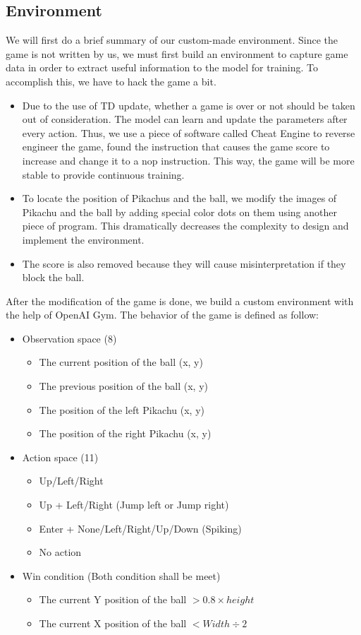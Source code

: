 \documentclass[sigconf]{acmart}
\begin{document}
\subsection{Environment}
We will first do a brief summary of our custom-made environment. Since the game is not written by us, we must first build an environment to capture game data in order to extract useful information to the model for training. To accomplish this, we have to hack the game a bit.
\begin{itemize}
  \item Due to the use of TD update, whether a game is over or not should be taken out of consideration. The model can learn and update the parameters after every action. Thus, we use a piece of software called Cheat Engine to reverse engineer the game, found the instruction that causes the game score to increase and change it to a nop instruction. This way, the game will be more stable to provide continuous training.
  \item To locate the position of Pikachus and the ball, we modify the images of Pikachu and the ball by adding special color dots on them using another piece of program. This dramatically decreases the complexity to design and implement the environment.
  \item The score is also removed because they will cause misinterpretation if they block the ball.
\end{itemize}
After the modification of the game is done, we build a custom environment with the help of OpenAI Gym. The behavior of the game is defined as follow:
\begin{itemize}
  \item Observation space (8)
     \begin{itemize} 
        \item The current position of the ball (x, y)
        \item The previous position of the ball (x, y)
        \item The position of the left Pikachu (x, y)
        \item The position of the right Pikachu (x, y)
     \end{itemize}
\item Action space (11)
  \begin{itemize} 
    \item Up/Left/Right
    \item Up + Left/Right (Jump left or Jump right)
    \item Enter + None/Left/Right/Up/Down (Spiking)
    \item No action
  \end{itemize}
\item Win condition (Both condition shall be meet)
  \begin{itemize} 
    \item The current Y position of the ball $ > 0.8 \times height$
    \item The current X position of the ball $ < Width \div 2$
  \end{itemize}
\end{itemize}
\end{document}

